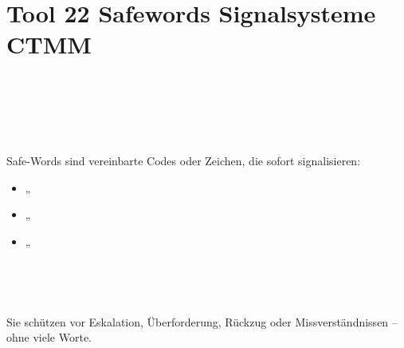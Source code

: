 
\section{Tool 22 Safewords Signalsysteme CTMM}
\label{sec:tool-22-safewords-signalsysteme-ctmm}

\hypertarget{tool-22-safe-words-signalsysteme-ctmm-modul}{%
\section[ 🛑 \ul{\textbf{\textcolor{ctmmBlue}{\1}}}]{\texorpdfstring{\protect\hypertarget{X17135db743ae21e51b6aab688c47340b081eb65}{}{} 🛑 \ul{\textbf{\textcolor{ctmmBlue}{\1}}}}{ 🛑 TOOL 22 -- SAFE-WORDS \& SIGNALSYSTEME (CTMM-MODUL)}}\label{tool-22-safe-words-signalsysteme-ctmm-modul}}

\hfill\break
\hfill\break

🧠 \ul{\textbf{\textcolor{ctmmBlue}{\1}}}\\
Safe-Words sind vereinbarte Codes oder Zeichen, die sofort signalisieren:

\begin{itemize}[label=\textcolor{ctmmOrange}{\faArrowRight}]
\item
  „\textbf{\textcolor{ctmmBlue}{\1}}
\item
  „\textbf{\textcolor{ctmmBlue}{\1}}
\item
  „\textbf{\textcolor{ctmmBlue}{\1}}\\
  \strut \\
  \strut \\
\end{itemize}

Sie schützen vor Eskalation, Überforderung, Rückzug oder Missverständnissen -- ohne viele Worte.

🧩 \ul{\textbf{\textcolor{ctmmBlue}{\1}}}

\hfill\break
\hfill\break

\hypertarget{kapitelzuordnung-im-ctmm-system}{%
\subsection[📘 \ul{\textbf{\textcolor{ctmmBlue}{\1}}}]{\texorpdfstring{\protect\hypertarget{kapitelzuordnung-im-ctmm-system}{}{}📘 \ul{\textbf{\textcolor{ctmmBlue}{\1}}}}{📘 KAPITELZUORDNUNG IM CTMM-SYSTEM}}\label{kapitelzuordnung-im-ctmm-system}}

